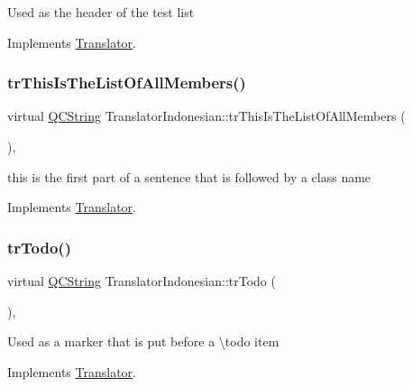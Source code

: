 Used as the header of the test list 

Implements \mbox{\hyperlink{class_translator}{Translator}}.

\mbox{\label{class_translator_indonesian_a237ee67dd021810a16cdeaa54960aa3a}} 
\subsubsection{\texorpdfstring{trThisIsTheListOfAllMembers()}{trThisIsTheListOfAllMembers()}}
{\footnotesize\ttfamily virtual \mbox{\hyperlink{class_q_c_string}{Q\+C\+String}} Translator\+Indonesian\+::tr\+This\+Is\+The\+List\+Of\+All\+Members (\begin{DoxyParamCaption}{ }\end{DoxyParamCaption})\hspace{0.3cm}{\ttfamily [inline]}, {\ttfamily [virtual]}}

this is the first part of a sentence that is followed by a class name 

Implements \mbox{\hyperlink{class_translator}{Translator}}.

\mbox{\label{class_translator_indonesian_adc365fe8ee744a3af6538c00108244c0}} 
\subsubsection{\texorpdfstring{trTodo()}{trTodo()}}
{\footnotesize\ttfamily virtual \mbox{\hyperlink{class_q_c_string}{Q\+C\+String}} Translator\+Indonesian\+::tr\+Todo (\begin{DoxyParamCaption}{ }\end{DoxyParamCaption})\hspace{0.3cm}{\ttfamily [inline]}, {\ttfamily [virtual]}}

Used as a marker that is put before a \textbackslash{}todo item 

Implements \mbox{\hyperlink{class_translator}{Translator}}.

\mbox{\label{class_translator_indonesian_a6b769260c3e3edc6b36a44ef75cd7aeb}} 
